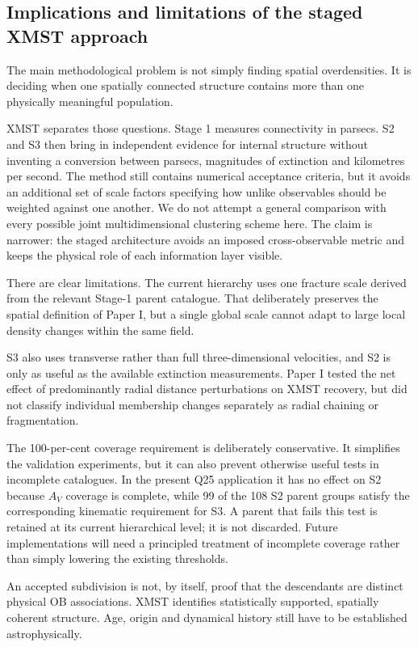 \documentclass[fleqn,usenatbib]{rasti}
\begin{document}
\subsection{Implications and limitations of the staged XMST approach}

The main methodological problem is not simply finding spatial overdensities. It is deciding when one spatially connected structure contains more than one physically meaningful population.

XMST separates those questions. Stage 1 measures connectivity in parsecs. S2 and S3 then bring in independent evidence for internal structure without inventing a conversion between parsecs, magnitudes of extinction and kilometres per second. The method still contains numerical acceptance criteria, but it avoids an additional set of scale factors specifying how unlike observables should be weighted against one another. We do not attempt a general comparison with every possible joint multidimensional clustering scheme here. The claim is narrower: the staged architecture avoids an imposed cross-observable metric and keeps the physical role of each information layer visible.

There are clear limitations. The current hierarchy uses one fracture scale derived from the relevant Stage-1 parent catalogue. That deliberately preserves the spatial definition of Paper I, but a single global scale cannot adapt to large local density changes within the same field.

S3 also uses transverse rather than full three-dimensional velocities, and S2 is only as useful as the available extinction measurements. Paper I tested the net effect of predominantly radial distance perturbations on XMST recovery, but did not classify individual membership changes separately as radial chaining or fragmentation.

The 100-per-cent coverage requirement is deliberately conservative. It simplifies the validation experiments, but it can also prevent otherwise useful tests in incomplete catalogues. In the present Q25 application it has no effect on S2 because $A_V$ coverage is complete, while 99 of the 108 S2 parent groups satisfy the corresponding kinematic requirement for S3. A parent that fails this test is retained at its current hierarchical level; it is not discarded. Future implementations will need a principled treatment of incomplete coverage rather than simply lowering the existing thresholds.

An accepted subdivision is not, by itself, proof that the descendants are distinct physical OB associations. XMST identifies statistically supported, spatially coherent structure. Age, origin and dynamical history still have to be established astrophysically.
\end{document}
